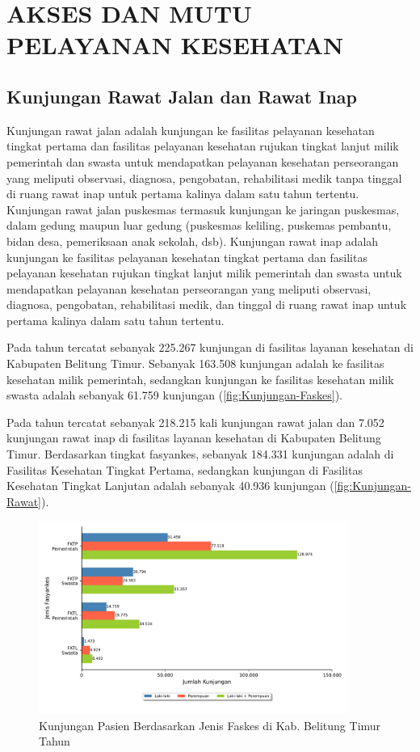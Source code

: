 \section{AKSES DAN MUTU PELAYANAN KESEHATAN}
\subsection{Kunjungan Rawat Jalan dan Rawat Inap}
Kunjungan rawat jalan adalah kunjungan ke fasilitas pelayanan kesehatan tingkat pertama dan fasilitas pelayanan kesehatan rujukan tingkat lanjut milik pemerintah dan swasta untuk mendapatkan pelayanan kesehatan perseorangan yang meliputi observasi, diagnosa, pengobatan, rehabilitasi medik tanpa tinggal di ruang rawat inap untuk pertama kalinya dalam satu tahun tertentu. Kunjungan rawat jalan puskesmas termasuk kunjungan ke jaringan puskesmas, dalam gedung maupun luar gedung (puskesmas keliling, puskemas pembantu, bidan desa, pemeriksaan anak sekolah, dsb).
Kunjungan rawat inap adalah kunjungan ke fasilitas pelayanan kesehatan tingkat pertama dan fasilitas pelayanan kesehatan rujukan tingkat lanjut milik pemerintah dan swasta untuk mendapatkan pelayanan kesehatan perseorangan yang meliputi observasi, diagnosa, pengobatan, rehabilitasi medik, dan tinggal di ruang rawat inap untuk pertama kalinya dalam satu tahun tertentu.

Pada tahun \tP tercatat sebanyak 225.267 kunjungan di fasilitas layanan kesehatan di Kabupaten Belitung Timur. Sebanyak 163.508 kunjungan adalah ke fasilitas kesehatan milik pemerintah, sedangkan kunjungan ke fasilitas kesehatan milik swasta adalah sebanyak 61.759 kunjungan (\autoref{fig:Kunjungan-Faskes}).

Pada tahun \tP tercatat sebanyak 218.215 kali kunjungan rawat jalan dan 7.052 kunjungan rawat inap di fasilitas layanan kesehatan di Kabupaten Belitung Timur. Berdasarkan tingkat fasyankes, sebanyak 184.331 kunjungan adalah di Fasilitas Kesehatan Tingkat Pertama, sedangkan kunjungan di Fasilitas Kesehatan Tingkat Lanjutan adalah sebanyak 40.936 kunjungan (\autoref{fig:Kunjungan-Rawat}).

\begin{figure}[!htb]
    \centering{}
    \includegraphics[width=0.9\textwidth]{bab_02/bab_02_1_kunjunganFaskes}
    \caption{Kunjungan Pasien Berdasarkan Jenis Faskes di Kab. Belitung Timur Tahun \tP}
    \label{fig:Kunjungan-Faskes}
\end{figure}

